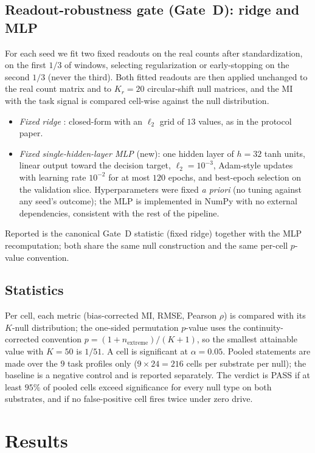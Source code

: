 \documentclass[journal]{IEEEtran}
\newcommand{\MI}{\mathrm{MI}}
\begin{document}
\subsection{Readout-robustness gate (Gate~D): ridge and MLP}
For each seed we fit two fixed readouts on the real counts after standardization,
on the first $1/3$ of windows, selecting regularization or early-stopping on the
second $1/3$ (never the third). Both fitted readouts are then applied unchanged
to the real count matrix and to $K_r=20$ circular-shift null matrices, and the
$\MI$ with the task signal is compared cell-wise against the null distribution.
\begin{itemize}
\item \emph{Fixed ridge} \cite{hoerl1970}: closed-form with an $\ell_2$ grid of
  $13$ values, as in the protocol paper.
\item \emph{Fixed single-hidden-layer MLP} (new): one hidden layer of $h=32$
  tanh units, linear output toward the decision target, $\ell_2=10^{-3}$,
  Adam-style updates with learning rate $10^{-2}$ for at most $120$ epochs, and
  best-epoch selection on the validation slice. Hyperparameters were fixed \emph{a
  priori} (no tuning against any seed's outcome); the MLP is implemented in
  NumPy with no external dependencies, consistent with the rest of the pipeline.
\end{itemize}
Reported is the canonical Gate~D statistic (fixed ridge) together with the MLP
recomputation; both share the same null construction and the same per-cell
$p$-value convention.

\subsection{Statistics}
Per cell, each metric (bias-corrected $\MI$, RMSE, Pearson $\rho$) is compared
with its $K$-null distribution; the one-sided permutation $p$-value uses the
continuity-corrected convention $p=(1+n_{\mathrm{extreme}})/(K+1)$, so the
smallest attainable value with $K=50$ is $1/51$. A cell is significant at
$\alpha=0.05$. Pooled statements are made over the $9$ task profiles only
($9\times24=216$ cells per substrate per null); the baseline is a negative
control and is reported separately. The verdict is PASS if at least $95\%$ of
pooled cells exceed significance for every null type on both substrates, and if
no false-positive cell fires twice under zero drive.

\section{Results}
\end{document}
